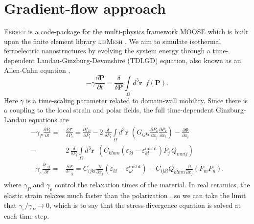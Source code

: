 \documentclass[16pt]{article} %
\begin{document}
\section{Gradient-flow approach}
%
%
\textsc{Ferret} is a code-package \cite{FerretLink} for the multi-physics framework MOOSE \cite{Gaston2009} which is built upon the finite element library \textsc{libMesh} \cite{Kirk2006}.
%
We aim to simulate isothermal ferroelectric nanostructures by evolving \cite{Su2007} the system energy through a time-dependent Landau-Ginzburg-Devonshire (TDLGD) equation, also known as an Allen-Cahn equation \cite{Tonks2012},
%
\begin{equation}\tag{10}
- \gamma \frac{\partial \textbf{P}}{\partial t} =  \frac{\delta}{\delta \textbf{P}}\int\limits_\Omega d^3 \textbf{r} \,\,\,f\left(\textbf{P} \right).
\end{equation}
%
Here $\gamma$ is a time-scaling parameter related to domain-wall mobility.
%
Since there is a coupling to the local strain and polar fields, the full time-dependent Ginzburg-Landau equations are
%
\begin{align}\tag{11}\label{eqn:tdGLP}
-\gamma_P\frac{\partial P_i}{\partial t} = & \frac{\delta {\mathcal F}}{\delta P_i}
=\frac{\partial f_B}{\partial P_i}-2 \, \frac{\delta}{\delta P_i} \int\limits_\Omega d^3 \textbf{r} \,\, \left(G_{ijkl}\frac{\partial P_k}{\partial x_j}\frac{\partial P_k}{\partial x_l}\right) - \frac{\partial \Phi}{\partial x_i}\nonumber\\
-& 2\, \frac{\delta}{\delta P_i} \int\limits_\Omega d^3 \textbf{r} \,\, \, \left(C_{klmn}\left(\varepsilon_{kl}-\varepsilon_{kl}^\mathrm{misfit}\right)P_j \, Q_{mnij} \right)\\
-\gamma_\varepsilon\frac{\partial\varepsilon_{ij}}{\partial t}  = &
\frac{\delta {\mathcal F}}{\delta\varepsilon_{ij}}=
C_{ijkl}\frac{\partial}{\partial x_j}\left(\varepsilon_{kl}-\varepsilon_{kl}^\mathrm{misfit}\right)
-C_{ijkl}Q_{klmn}\frac{\partial}{\partial x_j}\left(P_mP_n\right).\nonumber\\
\end{align}
%
where $\gamma_P$ and $\gamma_\varepsilon$ control the relaxation times of the material.
%
In real ceramics, the elastic strain relaxes much faster than the polarization \cite{Dawber2005, Nelson2011}, so we can take the limit that $\gamma_\varepsilon / \gamma_P \to 0$, which is to say that the stress-divergence equation is solved at each time step.
\end{document}
